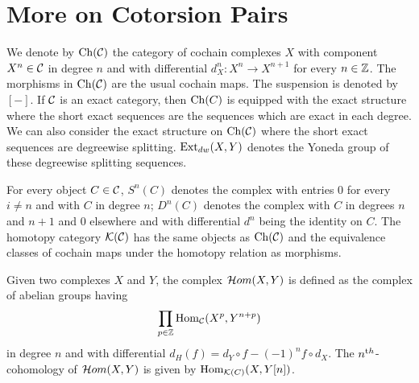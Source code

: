 \section{More on Cotorsion Pairs}\label{sec:more_cot}

\begin{sloppypar}
We denote by $\mathrm{Ch}(\mathcal{C})$ the category of cochain complexes $X$ with component $X^n\in \mathcal{C}$ in degree $n$ and with differential ${d^n_X\colon X^n\to X^{n+1}}$ for every $n\in \mathbb{Z}$. The morphisms in $\mathrm{Ch}(\mathcal{C})$ are the usual cochain maps. The suspension is denoted by $[-]$.
 If $\mathcal{C}$ is an exact category, then $\mathrm{Ch}(C)$ is equipped with the exact structure where the short exact sequences are the sequences which are exact in each degree. We can also consider the exact structure on $\mathrm{Ch}(\mathcal{C})$ where the short exact sequences are degreewise splitting. $\operatorname{Ext}_{dw}(X, Y)$ denotes the Yoneda group of these degreewise splitting sequences.
\end{sloppypar}

 For every object $C\in \mathcal{C}$, $S^n(C)$ denotes the complex with entries $0$ for every $i\neq n$ and with $C$ in degree $n$; $D^n(C)$ denotes the complex with $C$ in degrees $n$ and $n+1$ and $0$ elsewhere and with differential $d^n$ being the identity on $C$. The homotopy category $\mathcal{K}(\mathcal{C})$ has the same objects as $\mathrm{Ch}(\mathcal{C})$ and the equivalence classes of cochain maps under the homotopy relation as morphisms.

Given two complexes $X$ and $Y$, the complex $\mathcal{H}\mathnormal{om}(X, Y)$ is defined as the complex of abelian groups having \[\prod\limits_{p\in \mathbb{Z}}\operatorname{Hom}_{\mathcal{C}}(X^p, Y^{n+p})\] in degree $n$  and with differential $d_H(f)=d_Y\circ f -(-1)^nf\circ d_X$. The $n^{\text th}$-cohomology of  $\mathcal{H}\mathnormal{om}(X, Y)$ is given by $\operatorname{Hom}_{\mathcal{K}(C)} (X, Y[n])$.


